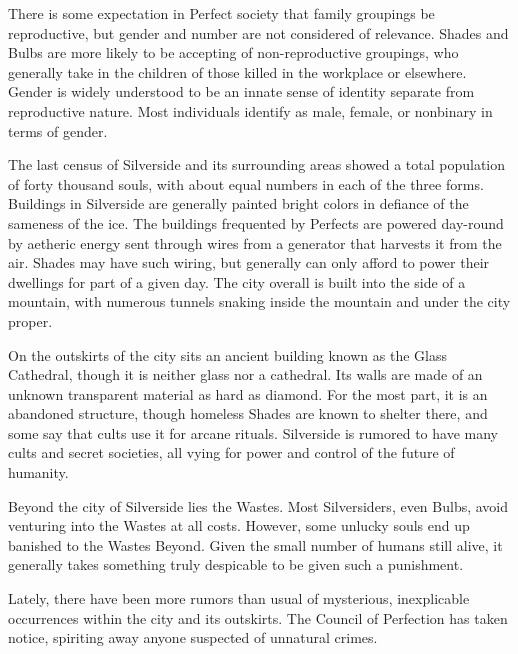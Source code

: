 \documentclass[blue]{Silversiders}
\begin{document}
There is some expectation in Perfect society that family groupings be reproductive, but gender and number are not considered of relevance. Shades and Bulbs are more likely to be accepting of non-reproductive groupings, who generally take in the children of those killed in the workplace or elsewhere. Gender is widely understood to be an innate sense of identity separate from reproductive nature. Most individuals identify as male, female, or nonbinary in terms of gender.

The last census of Silverside and its surrounding areas showed a total population of forty thousand souls, with about equal numbers in each of the three forms. Buildings in Silverside are generally painted bright colors in defiance of the sameness of the ice. The buildings frequented by Perfects are powered day-round by aetheric energy sent through wires from a generator that harvests it from the air. Shades may have such wiring, but generally can only afford to power their dwellings for part of a given day. The city overall is built into the side of a mountain, with numerous tunnels snaking inside the mountain and under the city proper.

On the outskirts of the city sits an ancient building known as the Glass Cathedral, though it is neither glass nor a cathedral. Its walls are made of an unknown transparent material as hard as diamond. For the most part, it is an abandoned structure, though homeless Shades are known to shelter there, and some say that cults use it for arcane rituals. Silverside is rumored to have many cults and secret societies, all vying for power and control of the future of humanity.

Beyond the city of Silverside lies the Wastes. Most Silversiders, even Bulbs, avoid venturing into the Wastes at all costs. However, some unlucky souls end up banished to the Wastes Beyond. Given the small number of humans still alive, it generally takes something truly despicable to be given such a punishment.

Lately, there have been more rumors than usual of mysterious, inexplicable occurrences within the city and its outskirts. The Council of Perfection has taken notice, spiriting away anyone suspected of unnatural crimes.
\end{document}
